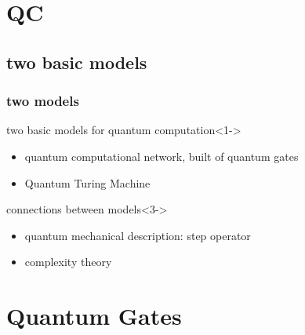 \documentclass{beamer}
\begin{document}
\section{QC}
\subsection{two basic models}
\begin{frame}
	\frametitle{two models}
    \begin{block}{two basic models for quantum computation}<1->
	    \begin{itemize}
    	    \item<2-> quantum computational network, built of quantum gates
        	\item<2-> Quantum Turing Machine
    	\end{itemize}
	\end{block}
	\begin{block}{connections between models}<3->
		\begin{itemize}
			\item<4-> quantum mechanical description: step operator
			\item<4-> complexity theory
		\end{itemize}
	\end{block}
\end{frame}
%
\begin{frame}
	\tableofcontents
\end{frame}
%
%
\section{Quantum Gates}
%
\end{document}
